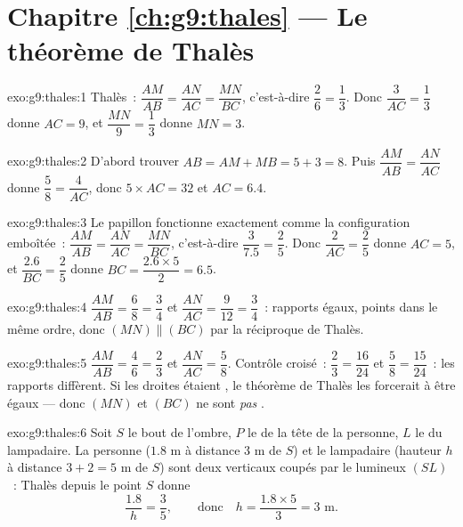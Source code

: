 \section*{Chapitre \ref{ch:g9:thales} --- Le théorème de Thalès}

\begin{solution}{exo:g9:thales:1}
Thalès~: $\dfrac{AM}{AB} = \dfrac{AN}{AC} = \dfrac{MN}{BC}$, c'est-à-dire
$\dfrac26 = \dfrac13$. Donc $\dfrac{3}{AC} = \dfrac13$ donne $AC = 9$,
et $\dfrac{MN}{9} = \dfrac13$ donne $MN = 3$.
\end{solution}

\begin{solution}{exo:g9:thales:2}
D'abord trouver $AB = AM + MB = 5 + 3 = 8$. Puis
$\dfrac{AM}{AB} = \dfrac{AN}{AC}$ donne $\dfrac58 = \dfrac{4}{AC}$, donc
$5 \times AC = 32$ et $AC = 6.4$.
\end{solution}

\begin{solution}{exo:g9:thales:3}
Le papillon fonctionne exactement comme la configuration emboîtée~:
$\dfrac{AM}{AB} = \dfrac{AN}{AC} = \dfrac{MN}{BC}$, c'est-à-dire
$\dfrac{3}{7.5} = \dfrac25$. Donc $\dfrac{2}{AC} = \dfrac25$ donne
$AC = 5$, et $\dfrac{2.6}{BC} = \dfrac25$ donne
$BC = \dfrac{2.6 \times 5}{2} = 6.5$.
\end{solution}

\begin{solution}{exo:g9:thales:4}
$\dfrac{AM}{AB} = \dfrac68 = \dfrac34$ et
$\dfrac{AN}{AC} = \dfrac{9}{12} = \dfrac34$~: rapports égaux, points
dans le même ordre, donc $(MN) \parallel (BC)$ par la réciproque de
Thalès.
\end{solution}

\begin{solution}{exo:g9:thales:5}
$\dfrac{AM}{AB} = \dfrac46 = \dfrac23$ et
$\dfrac{AN}{AC} = \dfrac58$. Contrôle croisé~: $\dfrac23 = \dfrac{16}{24}$
et $\dfrac58 = \dfrac{15}{24}$~: les rapports diffèrent. Si les droites
étaient , le théorème de Thalès les forcerait à être égaux ---
donc $(MN)$ et $(BC)$ ne sont \emph{pas} .
\end{solution}

\begin{solution}{exo:g9:thales:6}
Soit $S$ le bout de l'ombre, $P$ le  de la tête de la personne, $L$
le  du lampadaire. La personne ($1.8$ m à distance $3$ m de $S$)
et le lampadaire (hauteur $h$ à distance $3 + 2 = 5$ m de $S$) sont deux
 verticaux  coupés par le  lumineux $(SL)$~:
Thalès depuis le point $S$ donne
\[
\frac{1.8}{h} = \frac{3}{5},
\qquad\text{donc}\quad
h = \frac{1.8 \times 5}{3} = 3 \text{ m}.
\]
\end{solution}


